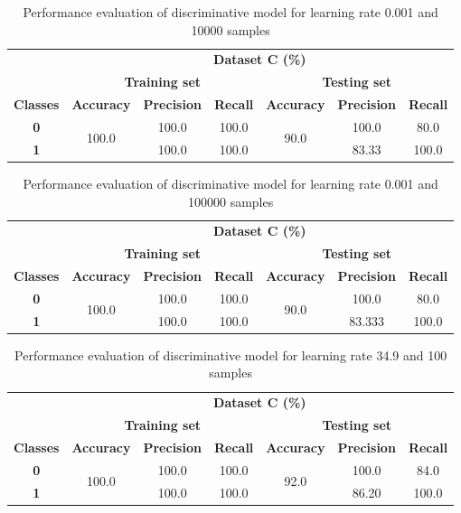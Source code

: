 \documentclass{article}
\begin{document}
  \begin{table}[h]
  \centering
  \caption{Performance evaluation of discriminative model for learning rate 0.001 and 10000 samples} \label{tab:10}
  \begin{tabular}{ccccccc}
  \cline{2-7}
  & \multicolumn{6}{c}{\textbf{Dataset C (\%)}} \\ \cline{2-7}
  & \multicolumn{3}{c}{\textbf{Training set}} & \multicolumn{3}{c}{\textbf{Testing set}} \\ \hline
  \textbf{Classes} & \textbf{Accuracy} & \textbf{Precision} & \textbf{Recall} & \textbf{Accuracy} & \textbf{Precision} & \textbf{Recall} \\ \hline
  \textbf{0} & \multirow{2}{*}{100.0} & 100.0 & 100.0 & \multirow{2}{*}{90.0} & 100.0 & 80.0 \\ \cline{1-1} \cline{3-4} \cline{6-7} 
  \textbf{1} &  & 100.0 & 100.0 &  & 83.33 & 100.0 \\ \hline
  \end{tabular}
  \end{table}
  
  \begin{table}[h]
  \centering
  \caption{Performance evaluation of discriminative model for learning rate 0.001 and 100000 samples} \label{tab:11}
  \begin{tabular}{ccccccc}
  \cline{2-7}
  & \multicolumn{6}{c}{\textbf{Dataset C (\%)}} \\ \cline{2-7}
  & \multicolumn{3}{c}{\textbf{Training set}} & \multicolumn{3}{c}{\textbf{Testing set}} \\ \hline
  \textbf{Classes} & \textbf{Accuracy} & \textbf{Precision} & \textbf{Recall} & \textbf{Accuracy} & \textbf{Precision} & \textbf{Recall} \\ \hline
  \textbf{0} & \multirow{2}{*}{100.0} & 100.0 & 100.0 & \multirow{2}{*}{90.0} & 100.0 & 80.0 \\ \cline{1-1} \cline{3-4} \cline{6-7} 
  \textbf{1} &  & 100.0 & 100.0 &  & 83.333 & 100.0 \\ \hline
  \end{tabular}
  \end{table}
  
  \begin{table}[h]
  \centering
  \caption{Performance evaluation of discriminative model for learning rate 34.9 and 100 samples} \label{tab:12}
  \begin{tabular}{ccccccc}
  \cline{2-7}
  & \multicolumn{6}{c}{\textbf{Dataset C (\%)}} \\ \cline{2-7}
  & \multicolumn{3}{c}{\textbf{Training set}} & \multicolumn{3}{c}{\textbf{Testing set}} \\ \hline
  \textbf{Classes} & \textbf{Accuracy} & \textbf{Precision} & \textbf{Recall} & \textbf{Accuracy} & \textbf{Precision} & \textbf{Recall} \\ \hline
  \textbf{0} & \multirow{2}{*}{100.0} & 100.0 & 100.0 & \multirow{2}{*}{92.0} & 100.0 & 84.0 \\ \cline{1-1} \cline{3-4} \cline{6-7} 
  \textbf{1} &  & 100.0 & 100.0 &  & 86.20 & 100.0 \\ \hline
  \end{tabular}
  \end{table}
  
\end{document}
